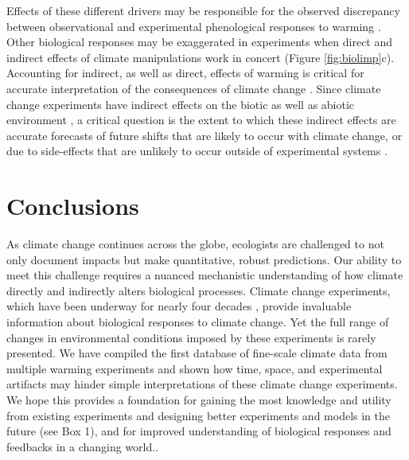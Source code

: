 \documentclass{article}
\begin{document}
Effects of these different drivers may be responsible for the observed discrepancy between observational and experimental phenological responses to warming \citep{wolkovich2012}. Other biological responses may be exaggerated in experiments when direct and indirect effects of climate manipulations work in concert (Figure \ref{fig:biolimp}c). Accounting for indirect, as well as direct, effects of warming is critical for accurate interpretation of the consequences of climate change \citep{kharouba2015}. Since climate change experiments have indirect effects on the biotic as well as abiotic environment \citep{hoeppner2012,pelini2014,diamond2016}, a critical question is the extent to which these indirect effects are accurate forecasts of future shifts that are likely to occur with climate change, or due to side-effects that are unlikely to occur outside of experimental systems \citep{moise2010,diamond2013}.
\section* {Conclusions}
 \par As climate change continues across the globe, ecologists are challenged to not only document impacts but make quantitative, robust predictions. Our ability to meet this challenge requires a nuanced mechanistic understanding of how climate directly and indirectly alters biological processes. Climate change experiments, which have been underway for nearly four decades \citep[e.g.,][]{tamaki1981,carlson1982}, provide invaluable information about biological responses to climate change. Yet the full range of changes in environmental conditions imposed by these experiments is rarely presented. We have compiled the first database of fine-scale climate data from multiple warming experiments and shown how time, space, and experimental artifacts may hinder simple interpretations of these climate change experiments. We hope this provides a foundation for gaining the most knowledge and utility from existing experiments and designing better experiments and models in the future (see Box 1), and for improved understanding of biological responses and feedbacks in a changing world.. %
\end{document}
